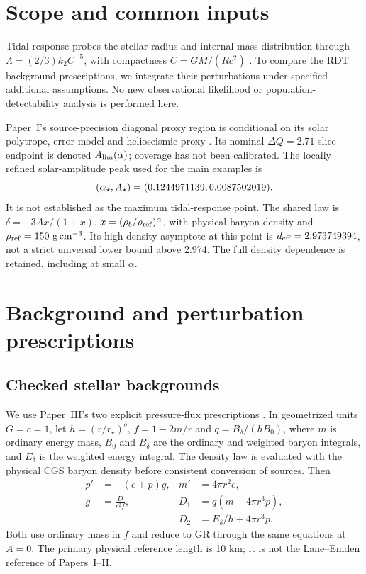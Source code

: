 \documentclass[twocolumn,prd,superscriptaddress,nofootinbib]{revtex4-2}
\begin{document}
\section{Scope and common inputs}
Tidal response probes the stellar radius and internal mass distribution
through $\Lambda=(2/3)k_2C^{-5}$, with compactness $C=GM/(Rc^2)$
\cite{Hinderer2008,Flanagan2008}. To compare the RDT background prescriptions,
we integrate their perturbations under specified additional assumptions.
No new observational likelihood or population-detectability analysis is
performed here.

Paper~I's source-precision diagonal proxy region is conditional on its
solar polytrope, error model and helioseismic proxy
\cite{PaperI,WorkingEvidence}. Its nominal $\Delta Q=2.71$ slice endpoint
is denoted $A_{\rm lim}(\alpha)$; coverage has not been calibrated.
The locally refined solar-amplitude peak used for the main examples is
\begin{equation}
 (\alpha_\star,A_\star)=(0.1244971139,0.0087502019).
 \label{eq:point}
\end{equation}
It is not established as the maximum tidal-response point. The shared
law is $\delta=-3Ax/(1+x)$, $x=(\rho_b/\rho_{\rm ref})^\alpha$,
with physical baryon density and $\rho_{\rm ref}=150~{\rm g\,cm^{-3}}$.
Its high-density asymptote at this point is $d_{\rm eff}=2.973749394$,
not a strict universal lower bound above 2.974. The full density dependence
is retained, including at small $\alpha$.

\section{Background and perturbation prescriptions}
\subsection{Checked stellar backgrounds}
We use Paper~III's two explicit pressure-flux prescriptions
\cite{PaperIII,WorkingEvidence}. In geometrized units $G=c=1$, let
$h=(r/r_\star)^\delta$, $f=1-2m/r$ and $q=B_\delta/(hB_0)$,
where $m$ is ordinary energy mass, $B_0$ and $B_\delta$ are the ordinary
and weighted baryon integrals, and $E_\delta$ is the weighted energy integral.
The density law is evaluated with the physical CGS baryon density before
consistent conversion of sources. Then
\begin{align}
 p'&=-(e+p)g, & m'&=4\pi r^2e,\\
 g&=\frac{D}{r^2f}, &
 D_1&=q(m+4\pi r^3p),\\
 &&D_2&=E_\delta/h+4\pi r^3p.
\end{align}
Both use ordinary mass in $f$ and reduce to GR through the same equations
at $A=0$. The primary physical reference length is 10 km; it is not the
Lane--Emden reference of Papers~I--II.
\end{document}

